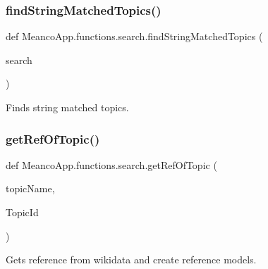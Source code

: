 \subsubsection{\texorpdfstring{find\+String\+Matched\+Topics()}{findStringMatchedTopics()}}
{\footnotesize\ttfamily def Meanco\+App.\+functions.\+search.\+find\+String\+Matched\+Topics (\begin{DoxyParamCaption}\item[{}]{search }\end{DoxyParamCaption})}



Finds string matched topics. 

\hypertarget{namespace_meanco_app_1_1functions_1_1search_a765863e89806bb8fd938f85d8f6db67a}{}\label{namespace_meanco_app_1_1functions_1_1search_a765863e89806bb8fd938f85d8f6db67a} 
\subsubsection{\texorpdfstring{get\+Ref\+Of\+Topic()}{getRefOfTopic()}}
{\footnotesize\ttfamily def Meanco\+App.\+functions.\+search.\+get\+Ref\+Of\+Topic (\begin{DoxyParamCaption}\item[{}]{topic\+Name,  }\item[{}]{Topic\+Id }\end{DoxyParamCaption})}



Gets reference from wikidata and create reference models. 

